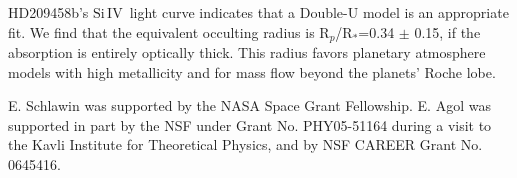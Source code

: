\documentclass[manuscript]{aastex}
\newcommand{\siIV}{\ensuremath{\mathrm{Si}\,\scriptstyle \mathrm{IV}}}
\newcommand{\p}{R$_p$/R$_*$}
\begin{document}
HD209458b's \siIV\ light curve indicates that a Double-U model is an appropriate fit. We find that the equivalent occulting radius is \p=0.34 $\pm$ 0.15, if the absorption is entirely optically thick. This radius favors planetary atmosphere models with high metallicity and for mass flow beyond the planets' Roche lobe.

E. Schlawin was supported by the NASA Space Grant Fellowship. E. Agol was supported in part by the NSF under Grant No.
PHY05-51164 during a visit to the Kavli Institute for
Theoretical Physics, and by NSF CAREER Grant No. 0645416.
\\

  
\end{document}
